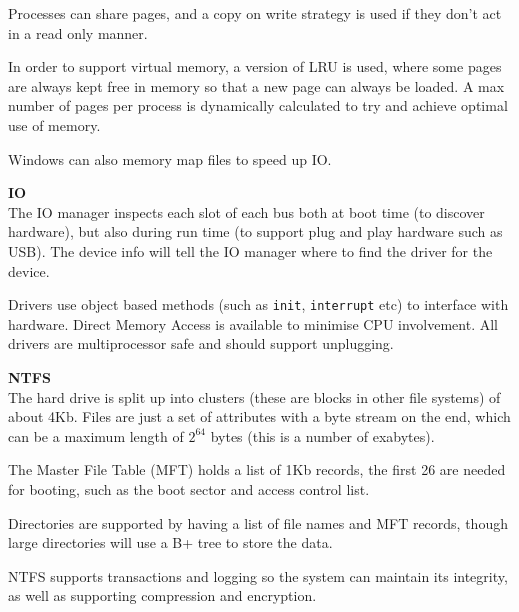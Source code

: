 \begin{description}
    Processes can share pages, and a copy on write strategy is used if they
    don't act in a read only manner.

    In order to support virtual memory, a version of LRU is used, where some
    pages are always kept free in memory so that a new page can always be
    loaded. A max number of pages per process is dynamically calculated to try
    and achieve optimal use of memory.

    Windows can also memory map files to speed up IO.

  \item \textbf{IO}\\
    The IO manager inspects each slot of each bus both at boot time (to discover
    hardware), but also during run time (to support plug and play hardware such
    as USB). The device info will tell the IO manager where to find the
    driver for the device.

    Drivers use object based methods (such as \texttt{init}, \texttt{interrupt}
    etc) to interface with hardware. Direct Memory Access is available to
    minimise CPU involvement. All drivers are multiprocessor safe and should
    support unplugging.

  \item \textbf{NTFS}\\
    The hard drive is split up into clusters (these are blocks in other file
    systems) of about 4Kb. Files are just a set of attributes with a byte stream
    on the end, which can be a maximum length of $2^64$ bytes (this is a number
    of exabytes).

    The Master File Table (MFT) holds a list of 1Kb records, the first 26 are
    needed for booting, such as the boot sector and access control list.

    Directories are supported by having a list of file names and MFT records,
    though large directories will use a B+ tree to store the data.

    NTFS supports transactions and logging so the system can maintain its
    integrity, as well as supporting compression and encryption.
\end{description}

